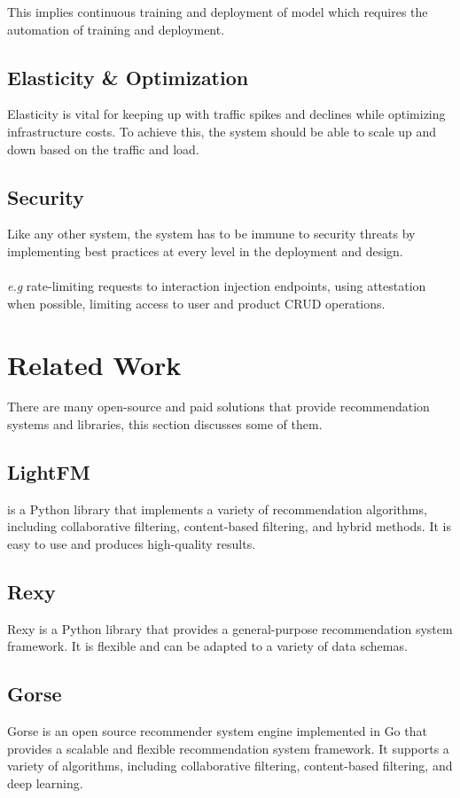 This implies continuous training and deployment of model which requires the automation of training and deployment.

\subsection{Elasticity \& Optimization}

Elasticity is vital for keeping up with traffic spikes and declines while optimizing infrastructure costs. To achieve this, the system should be able to scale up and down based on the traffic and load.

\subsection{Security}

Like any other system, the system has to be immune to security threats by implementing best practices at every level in the deployment and design. \\ \\
\textit{e.g} rate-limiting requests to interaction injection endpoints, using attestation when possible, limiting access to user and product CRUD operations.

\section{Related Work}

There are many open-source and paid solutions that provide recommendation systems and libraries, this section discusses some of them.

\subsection{LightFM \cite{LightFM}}
is a Python library that implements a variety of recommendation algorithms, including collaborative filtering, content-based filtering, and hybrid methods. It is easy to use and produces high-quality results.

\subsection{Rexy \cite{Rexy}}
Rexy is a Python library that provides a general-purpose recommendation system framework. It is flexible and can be adapted to a variety of data schemas.

\subsection{Gorse \cite{Rexy}}
Gorse is an open source recommender system engine implemented in Go that provides a scalable and flexible recommendation system framework. It supports a variety of algorithms, including collaborative filtering, content-based filtering, and deep learning.

